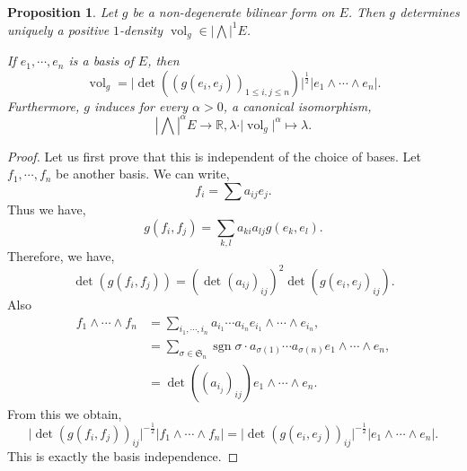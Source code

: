 \documentclass[8pt]{article}
\newtheorem{proposition}{Proposition}[section]
\DeclareMathOperator{\sgn}{sgn}
\DeclareMathOperator{\vol}{vol}
\newcommand{\R}[0]{\mathbb{R}}
\begin{document}
\begin{proposition}
  \label{proposition_11_6}
  Let $g$ be a non-degenerate bilinear form on $E$. Then $g$ determines uniquely a positive $1$-density $\vol_g\in\left\vert\bigwedge\right\vert^1 E$. 
  \par If $e_1,\cdots,e_n$ is a basis of $E$, then 
  \begin{equation*}
    \vol_g = \vert\det((g(e_i,e_j))_{1\leq i,j\leq n})\vert^{{\frac 1 2}}\vert e_1\wedge\cdots\wedge e_n\vert.
  \end{equation*}
  Furthermore, $g$ induces for every $\alpha>0$, a canonical isomorphism,
  \begin{equation*}
    \left\vert\bigwedge\right\vert^\alpha E\to \R, \lambda\cdot\vert\vol_g\vert^\alpha\mapsto\lambda.
  \end{equation*}
\end{proposition}

\begin{proof}
  Let us first prove that this is independent of the choice of bases. Let $f_1,\cdots,f_n$ be another basis. We can write,
  \begin{equation*}
    f_i = \sum a_{ij}e_j.
  \end{equation*}
  Thus we have,
  \begin{equation*}
    g(f_i,f_j) = \sum_{k,l}a_{ki}a_{lj}g(e_k,e_l).
  \end{equation*}
  Therefore, we have,
  \begin{equation*}
    \det(g(f_i,f_j)) = (\det(a_{ij})_{ij})^2\det(g(e_i,e_j)_{ij}).
  \end{equation*}
  Also 
  \begin{align*}
    f_1\wedge\cdots\wedge f_n & = \sum_{i_1,\cdots,i_n}a_{i_1}\cdots a_{i_n}e_{i_1}\wedge\cdots\wedge e_{i_n},\\
    & = \sum_{\sigma\in\mathfrak{S}_n}\sgn\sigma \cdot a_{\sigma(1)}\cdots a_{\sigma(n)}e_1\wedge\cdots\wedge e_n,\\
    & = \det((a_{i_j})_{ij})e_1\wedge\cdots\wedge e_n.
  \end{align*}
  From this we obtain,
  \begin{equation*}
    \vert\det (g(f_i,f_j))_{ij}\vert^{-{\frac 1 2}}\vert f_1\wedge\cdots \wedge f_n\vert =\vert\det (g(e_i,e_j))_{ij}\vert^{-{\frac 1 2}}\vert e_1\wedge\cdots \wedge e_n\vert.
  \end{equation*}
  This is exactly the basis independence.
\end{proof}
\end{document}
